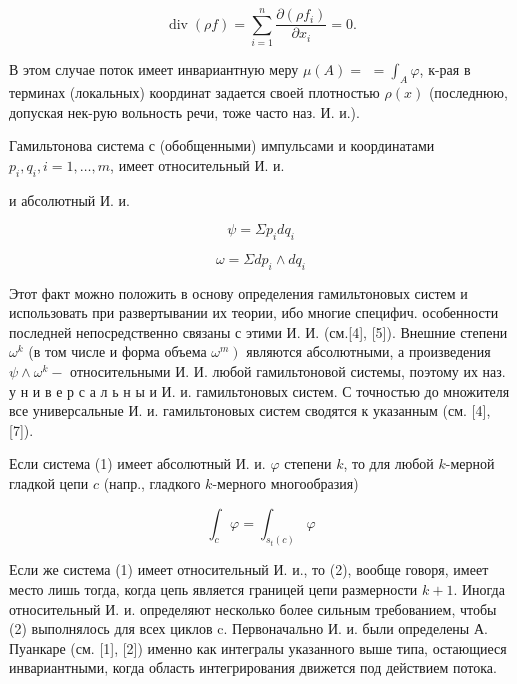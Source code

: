\documentclass[10pt]{article}
\begin{document}
\[

\operatorname{div}(\rho f)=\sum_{i=1}^{n} \frac{\partial\left(\rho f_{i}\right)}{\partial x_{i}}=0 .

\]



В этом случае поток имеет инвариантную меру $\mu(A)=$ $=\int_{A} \varphi$, к-рая в терминах (локальных) координат задается своей плотностью $\rho(x)$ (последнюю, допуская нек-рую вольность речи, тоже часто наз. И. и.).



Гамильтонова система с (обобщенными) импульсами и координатами $p_{i}, q_{i}, i=1, \ldots, m$, имеет относительный И. и.



и абсолютный И. и.



\[

\psi=\Sigma p_{i} d q_{i}

\]



\[

\omega=\Sigma d p_{i} \wedge d q_{i}

\]



Этот факт можно положить в основу определения гамильтоновых систем и использовать при развертывании их теории, ибо многие специфич. особенности последней непосредственно связаны с этими И. И. (см.[4], [5]). Внешние степени $\omega^{k}$ (в том числе и форма объема $\left.\omega^{m}\right)$ являются абсолютными, а произведения $\psi \wedge \omega^{k}-$ относительными И. И. любой гамильтоновой системы, поэтому их наз. у н и в е р с а л ь н ы и И. и. гамильтоновых систем. С точностью до множителя все универсальные И. и. гамильтоновых систем сводятся к указанным (см. [4], [7]).



Если система (1) имеет абсолютный И. и. $\varphi$ степени $k$, то для любой $k$-мерной гладкой цепи $c$ (напр., гладкого $k$-мерного многообразия)



\[

\int_{c} \varphi=\int_{s_{t}(c)} \varphi

\]



Если же система (1) имеет относительный И. и., то (2), вообще говоря, имеет место лишь тогда, когда цепь является границей цепи размерности $k+1$. Иногда относительный И. и. определяют несколько более сильным требованием, чтобы (2) выполнялось для всех циклов c. Первоначально И. и. были определены А. Пуанкаре (см. [1], [2]) именно как интегралы указанного выше типа, остающиеся инвариантными, когда область интегрирования движется под действием потока.
\end{document}
